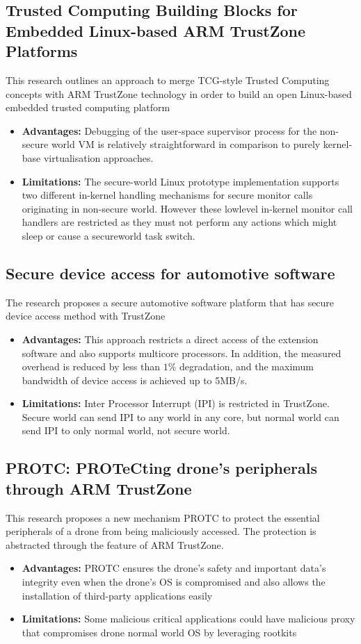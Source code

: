 \documentclass[conference]{IEEEtran}
\begin{document}
\subsection{Trusted Computing Building Blocks for Embedded Linux-based ARM TrustZone Platforms}
\cite{emb2} This research outlines an approach to merge TCG-style Trusted Computing concepts with ARM TrustZone technology in order to build an open Linux-based embedded trusted computing platform
\begin{itemize}
    \item \textbf{Advantages:} Debugging of the user-space supervisor process for the non-secure world VM is relatively straightforward in comparison to purely kernel-base virtualisation approaches.
    \item \textbf{Limitations:} The secure-world Linux prototype implementation supports two different in-kernel handling mechanisms for secure monitor calls originating in non-secure world. However these lowlevel in-kernel monitor call handlers are restricted as they must not perform any actions which might sleep or cause a secureworld task switch.
\end{itemize}


\subsection{Secure device access for automotive software}
\cite{emb3} The research proposes a secure automotive software platform that has secure device access method with TrustZone
\begin{itemize}
    \item \textbf{Advantages:} This approach restricts a direct access of the extension software and also supports multicore processors. In addition, the measured overhead is reduced by less than $1\%$ degradation, and the maximum bandwidth of device access is achieved up to 5MB/s.
    \item \textbf{Limitations:} Inter Processor Interrupt (IPI) is restricted in TrustZone. Secure world can send IPI to any world in any core, but normal world can send IPI to only normal world, not secure world.
\end{itemize}


\subsection{PROTC: PROTeCting drone’s peripherals through ARM TrustZone}
\cite{emb4} This research proposes a new mechanism PROTC to protect the essential peripherals of a drone from being maliciously accessed. The protection is abstracted through the feature of ARM TrustZone.
\begin{itemize}
    \item \textbf{Advantages:} PROTC ensures the drone’s safety and important data’s integrity even when the drone’s OS is compromised and also allows the installation of third-party applications easily
    \item \textbf{Limitations:} Some malicious critical applications could have malicious proxy that compromises drone normal world OS by leveraging rootkits
\end{itemize}
\end{document}

